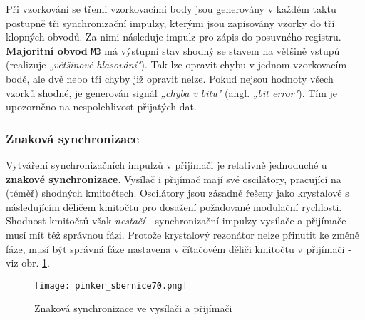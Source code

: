         Při vzorkování se třemi vzorkovacími body jsou generovány v každém taktu postupně tři 
        synchronizační impulzy, kterými jsou zapisovány vzorky do tří klopných obvodů. Za nimi 
        následuje impulz pro zápis do posuvného registru. \textbf{Majoritní obvod} \texttt{M3} má 
        výstupní stav shodný se stavem na většině vstupů (realizuje \emph{„většinové hlasování"}). 
        Tak lze opravit chybu v jednom vzorkovacím bodě, ale dvě nebo tři chyby již opravit nelze. 
        Pokud nejsou hodnoty všech vzorků shodné, je generován signál  \emph{„chyba v bitu"} (angl. 
        \emph{„bit error"}). Tím je upozorněno na nespolehlivost přijatých dat.
        
        
      \subsubsection{Znaková synchronizace}\label{MIT:chap_znak_synchr}
        Vytváření synchronizačních impulzů v přijímači je relativně jednoduché u \textbf{znakové 
        synchronizace}. Vysílač i přijímač mají své oscilátory, pracující na (téměř) shodných 
        kmitočtech. Oscilátory jsou zásadně řešeny jako krystalové s následujícím děličem kmitočtu 
        pro dosažení požadované modulační rychlosti. Shodnost kmitočtů však \emph{nestačí} - 
        synchronizační impulzy vysílače a přijímače musí mít též správnou fázi. Protože krystalový 
        rezonátor nelze přinutit ke změně fáze, musí být správná fáze nastavena v čítačovém děliči 
        kmitočtu v přijímači - viz obr. 
        \ref{MIT:fig_sbernice70}.
        
        \begin{figure}[ht!] %
          \centering
          \texttt{[image: pinker\_sbernice70.png]}
          \caption{Znaková synchronizace ve vysílači a přijímači}
          \label{MIT:fig_sbernice70}
        \end{figure}
        
